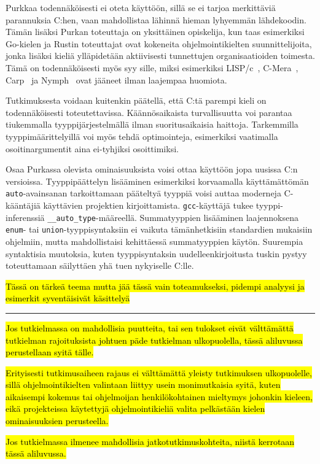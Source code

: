 Purkkaa todennäköisesti ei oteta käyttöön, sillä se ei tarjoa merkittäviä
parannuksia C:hen, vaan mahdollistaa lähinnä hieman lyhyemmän lähdekoodin.
Tämän lisäksi Purkan toteuttaja on yksittäinen opiskelija, kun taas esimerkiksi
Go-kielen ja Rustin toteuttajat ovat kokeneita ohjelmointikielten
suunnittelijoita, jonka lisäksi kieliä ylläpidetään aktiivisesti tunnettujen
organisaatioiden toimesta. Tämä on todennäköisesti myös syy sille, miksi
esimerkiksi LISP/c~\citep{clisp1}, C-Mera~\citep{clisp2}, Carp~\citep{clisp3}
ja Nymph~\citep{nymph} ovat jääneet ilman laajempaa huomiota.

Tutkimuksesta voidaan kuitenkin päätellä, että C:tä parempi kieli on
todennäköisesti toteutettavissa. Käännösaikaista turvallisuutta voi parantaa
tiukemmalla tyyppijärjestelmällä ilman suoritusaikaisia haittoja. Tarkemmilla
tyyppimäärittelyillä voi myös tehdä optimointeja, esimerkiksi vaatimalla
osoitinargumentit aina ei-tyhjiksi osoittimiksi.

Osaa Purkassa olevista ominaisuuksista voisi ottaa käyttöön jopa uusissa C:n
versioissa. Tyyppipäättelyn lisääminen esimerkiksi korvaamalla käyttämättömän
\texttt{auto}-avainsanan tarkoittamaan pääteltyä tyyppiä voisi auttaa
moderneja C-kääntäjiä käyttävien projektien kirjoittamista.
\texttt{gcc}-käyttäjä tukee tyyppi-inferenssiä
\texttt{\_\_auto\_type}-määreellä. Summatyyppien lisääminen laajennoksena
\texttt{enum}- tai \texttt{union}-tyyppisyntaksiin ei vaikuta tämänhetkisiin
standardien mukaisiin ohjelmiin, mutta mahdollistaisi kehittäessä summatyyppien
käytön. Suurempia syntaktisia muutoksia, kuten tyyppisyntaksin
uudelleenkirjoitusta tuskin pystyy toteuttamaan säilyttäen yhä tuen nykyiselle
C:lle.

\hl{Tässä on tärkeä teema mutta jää tässä vain toteamukseksi, pidempi analyysi
ja esimerkit syventäisivät käsittelyä}

\hrule

\hl{Jos tutkielmassa on mahdollisia puutteita, tai sen tulokset eivät
välttämättä tutkielman rajoituksista johtuen päde tutkielman ulkopuolella,
tässä aliluvussa perustellaan syitä tälle.}

\hl{Erityisesti tutkimusaiheen rajaus ei välttämättä yleisty tutkimuksen
ulkopuolelle, sillä ohjelmointikielten valintaan liittyy usein monimutkaisia
syitä, kuten aikaisempi kokemus tai ohjelmoijan henkilökohtainen mieltymys
johonkin kieleen, eikä projekteissa käytettyjä ohjelmointikieliä valita
pelkästään kielen ominaisuuksien perusteella.}

\hl{Jos tutkielmassa ilmenee mahdollisia jatkotutkimuskohteita, niistä
kerrotaan tässä aliluvussa.}
